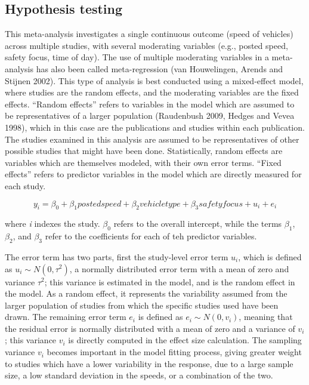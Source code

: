 \documentclass[]{article}
\begin{document}
\subsection{Hypothesis testing}\label{hypothesis-testing}

This meta-analysis investigates a single continuous outcome (speed of
vehicles) across multiple studies, with several moderating variables
(e.g., posted speed, safety focus, time of day). The use of multiple
moderating variables in a meta-analysis has also been called
meta-regression (van Houwelingen, Arends and Stijnen 2002). This type of
analysis is best conducted using a mixed-effect model, where studies are
the random effects, and the moderating variables are the fixed effects.
``Random effects'' refers to variables in the model which are assumed to
be representatives of a larger population (Raudenbush 2009, Hedges and
Vevea 1998), which in this case are the publications and studies within
each publication. The studies examined in this analysis are assumed to
be representatives of other possible studies that might have been done.
Statistically, random effects are variables which are themselves
modeled, with their own error terms. ``Fixed effects'' refers to
predictor variables in the model which are directly measured for each
study.

\[ y_{i} = \beta_{0} + \beta_{1}posted speed + \beta_{2} vehicle type+\beta_{3}safety focus + u_{i} + e_{i} \]

where \emph{i} indexes the study. \(\beta_{0}\) refers to the overall
intercept, while the terms \(\beta_{1}\), \(\beta_{2}\), and
\(\beta_{3}\) refer to the coefficients for each of teh predictor
variables.

The error term has two parts, first the study-level error term
\(u_{i}\), which is defined as \(u_{i} \sim N(0, \tau^{2})\), a normally
distributed error term with a mean of zero and variance \(\tau^{2}\);
this variance is estimated in the model, and is the random effect in the
model. As a random effect, it represents the variability assumed from
the larger population of studies from which the specific studies used
have been drawn. The remaining error term \(e_{i}\) is defined as
\(e_{i} \sim N(0, v_{i})\), meaning that the residual error is normally
distributed with a mean of zero and a variance of \(v_{i}\); this
variance \(v_{i}\) is directly computed in the effect size calculation.
The sampling variance \(v_{i}\) becomes important in the model fitting
process, giving greater weight to studies which have a lower variability
in the response, due to a large sample size, a low standard deviation in
the speeds, or a combination of the two.
\end{document}
